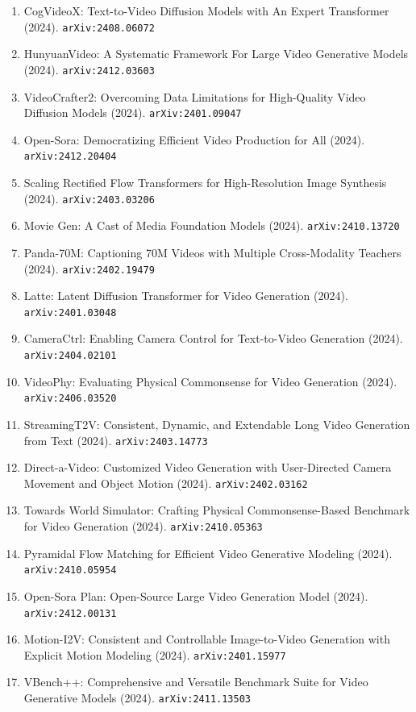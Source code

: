 \documentclass[11pt]{article}
\begin{document}
\begin{enumerate}
  \item CogVideoX: Text-to-Video Diffusion Models with An Expert Transformer (2024). \texttt{arXiv:2408.06072}
  \item HunyuanVideo: A Systematic Framework For Large Video Generative Models (2024). \texttt{arXiv:2412.03603}
  \item VideoCrafter2: Overcoming Data Limitations for High-Quality Video
  Diffusion Models (2024). \texttt{arXiv:2401.09047}
  \item Open-Sora: Democratizing Efficient Video Production for All (2024). \texttt{arXiv:2412.20404}
  \item Scaling Rectified Flow Transformers for High-Resolution Image Synthesis (2024). \texttt{arXiv:2403.03206}
  \item Movie Gen: A Cast of Media Foundation Models (2024). \texttt{arXiv:2410.13720}
  \item Panda-70M: Captioning 70M Videos with Multiple Cross-Modality Teachers (2024). \texttt{arXiv:2402.19479}
  \item Latte: Latent Diffusion Transformer for Video Generation (2024). \texttt{arXiv:2401.03048}
  \item CameraCtrl: Enabling Camera Control for Text-to-Video Generation (2024). \texttt{arXiv:2404.02101}
  \item VideoPhy: Evaluating Physical Commonsense for Video Generation (2024). \texttt{arXiv:2406.03520}
  \item StreamingT2V: Consistent, Dynamic, and Extendable Long Video Generation
  from Text (2024). \texttt{arXiv:2403.14773}
  \item Direct-a-Video: Customized Video Generation with User-Directed Camera
  Movement and Object Motion (2024). \texttt{arXiv:2402.03162}
  \item Towards World Simulator: Crafting Physical Commonsense-Based Benchmark
  for Video Generation (2024). \texttt{arXiv:2410.05363}
  \item Pyramidal Flow Matching for Efficient Video Generative Modeling (2024). \texttt{arXiv:2410.05954}
  \item Open-Sora Plan: Open-Source Large Video Generation Model (2024). \texttt{arXiv:2412.00131}
  \item Motion-I2V: Consistent and Controllable Image-to-Video Generation with
  Explicit Motion Modeling (2024). \texttt{arXiv:2401.15977}
  \item VBench++: Comprehensive and Versatile Benchmark Suite for Video
  Generative Models (2024). \texttt{arXiv:2411.13503}

\end{enumerate}
\end{document}
